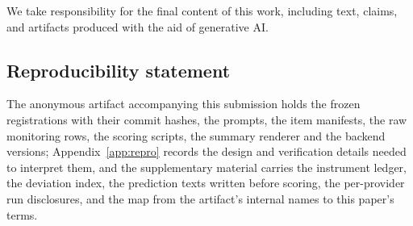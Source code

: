\documentclass{article}
\begin{document}
We take responsibility for the final content of this work, including text, claims, and artifacts produced with the aid of generative AI.

\subsection*{Reproducibility statement}

The anonymous artifact accompanying this submission holds the frozen registrations with their commit hashes, the prompts, the item manifests, the raw monitoring rows, the scoring scripts, the summary renderer and the backend versions; Appendix~\ref{app:repro} records the design and verification details needed to interpret them, and the supplementary material carries the instrument ledger, the deviation index, the prediction texts written before scoring, the per-provider run disclosures, and the map from the artifact's internal names to this paper's terms.


\appendix
\end{document}
